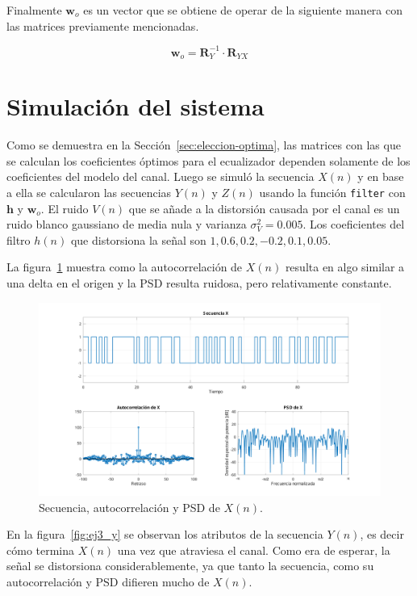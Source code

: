 Finalmente $\mathbf{w}_o$ es un vector que se obtiene de operar de la siguiente manera con las matrices previamente mencionadas.

\begin{equation}
	\mathbf{w}_o = \mathbf{R}_Y^{-1} \cdot \mathbf{R}_{YX}
\end{equation}

\section{Simulación del sistema}

Como se demuestra en la Sección~\ref{sec:eleccion-optima}, las matrices con las que se calculan los coeficientes óptimos para el ecualizador dependen solamente de los coeficientes del modelo del canal. Luego se simuló la secuencia $X(n)$ y en base a ella se calcularon las secuencias $Y(n)$ y $Z(n)$ usando la función \verb|filter| con $\mathbf{h}$ y $\mathbf{w}_o$. El ruido $V(n)$ que se añade a la distorsión causada por el canal es un ruido blanco gaussiano de media nula y varianza $\sigma_V^2 = 0.005$. Los coeficientes del filtro $h(n)$ que distorsiona la señal son ${1, 0.6, 0.2, -0.2, 0.1, 0.05}$.

La figura~\ref{fig:ej3_x} muestra como la autocorrelación de $X(n)$ resulta en algo similar a una delta en el origen y la PSD resulta ruidosa, pero relativamente constante.

\begin{figure}[!hbp]
	\centering
    \includegraphics[width=1\linewidth,trim=4cm 0 4cm 0,clip]{img/ej3_x.pdf}
	\caption{Secuencia, autocorrelación y PSD de $X(n)$.}
	\label{fig:ej3_x}
\end{figure}

En la figura~\ref{fig:ej3_y} se observan los atributos de la secuencia $Y(n)$, es decir cómo termina $X(n)$ una vez que atraviesa el canal. Como era de esperar, la señal se distorsiona considerablemente, ya que tanto la secuencia, como su autocorrelación y PSD difieren mucho de $X(n)$.

